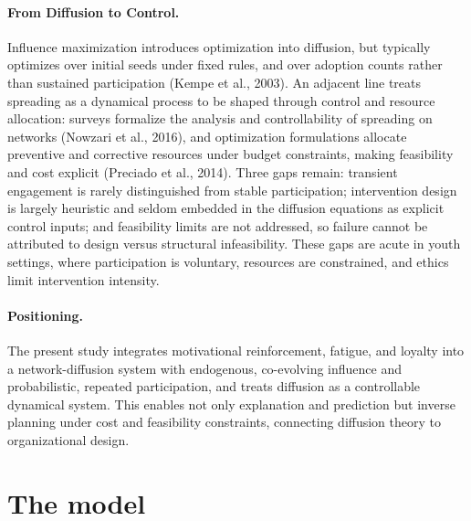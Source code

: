 \documentclass[11pt]{article}
\begin{document}
\paragraph{From Diffusion to Control.}
Influence maximization introduces optimization into diffusion, but typically optimizes over initial seeds under fixed rules, and over adoption counts rather than sustained participation (Kempe et al., 2003). An adjacent line treats spreading as a dynamical process to be shaped through control and resource allocation: surveys formalize the analysis and controllability of spreading on networks (Nowzari et al., 2016), and optimization formulations allocate preventive and corrective resources under budget constraints, making feasibility and cost explicit (Preciado et al., 2014). Three gaps remain: transient engagement is rarely distinguished from stable participation; intervention design is largely heuristic and seldom embedded in the diffusion equations as explicit control inputs; and feasibility limits are not addressed, so failure cannot be attributed to design versus structural infeasibility. These gaps are acute in youth settings, where participation is voluntary, resources are constrained, and ethics limit intervention intensity.

\paragraph{Positioning.}
The present study integrates motivational reinforcement, fatigue, and loyalty into a network-diffusion system with endogenous, co-evolving influence and probabilistic, repeated participation, and treats diffusion as a controllable dynamical system. This enables not only explanation and prediction but inverse planning under cost and feasibility constraints, connecting diffusion theory to organizational design.

\section{The model}\label{sec:model}
\end{document}
